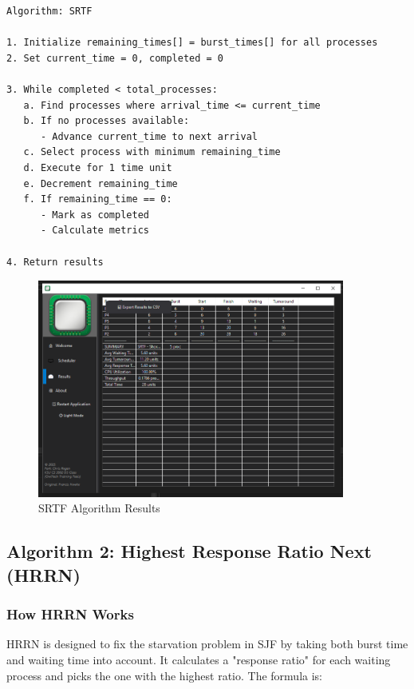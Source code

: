 \documentclass[12pt,letterpaper]{article}
\begin{document}
\begin{verbatim}
Algorithm: SRTF

1. Initialize remaining_times[] = burst_times[] for all processes
2. Set current_time = 0, completed = 0

3. While completed < total_processes:
   a. Find processes where arrival_time <= current_time
   b. If no processes available:
      - Advance current_time to next arrival
   c. Select process with minimum remaining_time
   d. Execute for 1 time unit
   e. Decrement remaining_time
   f. If remaining_time == 0:
      - Mark as completed
      - Calculate metrics
      
4. Return results
\end{verbatim}

\begin{figure}[H]
    \centering
    \includegraphics[width=0.9\textwidth]{srtf_results.png}
    \caption{SRTF Algorithm Results}
    \label{fig:srtf}
\end{figure}

\newpage

\subsection{Algorithm 2: Highest Response Ratio Next (HRRN)}

\subsubsection{How HRRN Works}

HRRN is designed to fix the starvation problem in SJF by taking both burst time 
and waiting time into account. It calculates a "response ratio" for each waiting 
process and picks the one with the highest ratio. The formula is:
\end{document}

